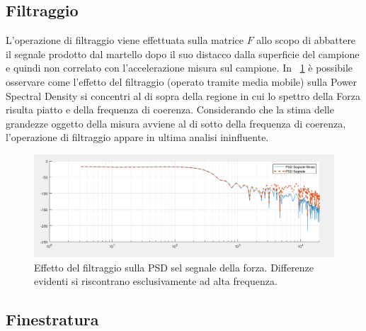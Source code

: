 \documentclass[12pt,a4paper]{article}
\begin{document}
 \subsection{Filtraggio}
 L'operazione di filtraggio viene effettuata sulla matrice $F$ allo scopo di abbattere il segnale prodotto dal martello dopo il suo distacco dalla superficie del campione e quindi non correlato con l'accelerazione misura sul campione. In \figurename~\ref{fig:Effettofiltraggio} è possibile osservare come l'effetto del filtraggio (operato tramite media mobile) sulla Power Spectral Density si concentri al di sopra della regione in cui lo spettro della Forza risulta piatto e della frequenza di coerenza. Considerando che la stima delle grandezze oggetto della misura avviene al di sotto della frequenza di coerenza, l'operazione di filtraggio  appare in ultima analisi ininfluente.
 \begin{figure}
	\centering
	\includegraphics[width=14cm]{Effettofiltraggio}
	\caption{Effetto del filtraggio sulla PSD sel segnale della forza. Differenze evidenti si riscontrano esclusivamente ad alta frequenza.}
	\label{fig:Effettofiltraggio}
 \end{figure}

\subsection{Finestratura}
\end{document}
